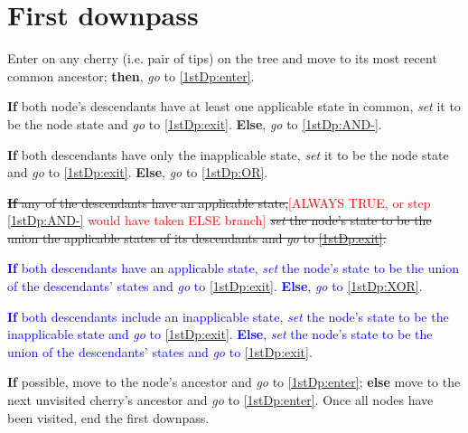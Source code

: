 \documentclass[a4paper,12pt]{article}
\begin{document}

\section{First downpass} \label{1stDp}



\begin{enumerate}
    \item Enter on any cherry (i.e. pair of tips) on the tree and move to its most recent common ancestor; \textbf{then}, \textit{go} to \ref{1stDp:enter}.
    \item \label{1stDp:enter} \textbf{If} both node's descendants have at least one applicable state in common, \textit{set} it to be the node state and \textit{go} to \ref{1stDp:exit}. \textbf{Else}, \textit{go} to \ref{1stDp:AND-}.
    \item \label{1stDp:AND-} \textbf{If} both descendants have only the inapplicable state, \textit{set} it to be the node state and \textit{go} to \ref{1stDp:exit}. \textbf{Else}, \textit{go} to \ref{1stDp:OR}.
    \item \label{1stDp:OR} \sout{\textbf{If} any of the descendants have an applicable state,}\textcolor{red}{[ALWAYS TRUE, or step \ref{1stDp:AND-} would have taken ELSE branch]}\sout{ \textit{set} the node's state to be the union the applicable states of its descendants and \textit{go} to \ref{1stDp:exit}.}\\
    \textcolor{blue}{\textbf{If} both descendants have an applicable state, \textit{set} the node's state to be the union of the descendants' states and \textit{go} to \ref{1stDp:exit}. \textbf{Else}, \textit{go} to \ref{1stDp:XOR}.
    \item \label{1stDp:XOR} \textbf{If} both descendants include an inapplicable state, \textit{set} the node's state to be the inapplicable state and \textit{go} to \ref{1stDp:exit}. \textbf{Else}, \textit{set} the node's state to be the union of the descendants' states and \textit{go} to \ref{1stDp:exit}.
    }
    \item \label{1stDp:exit} \textbf{If} possible, move to the node's ancestor and \textit{go} to \ref{1stDp:enter}; \textbf{else} move to the next unvisited cherry's ancestor and \textit{go} to \ref{1stDp:enter}. Once all nodes have been visited, end the first downpass.
\end{enumerate}
\end{document}
